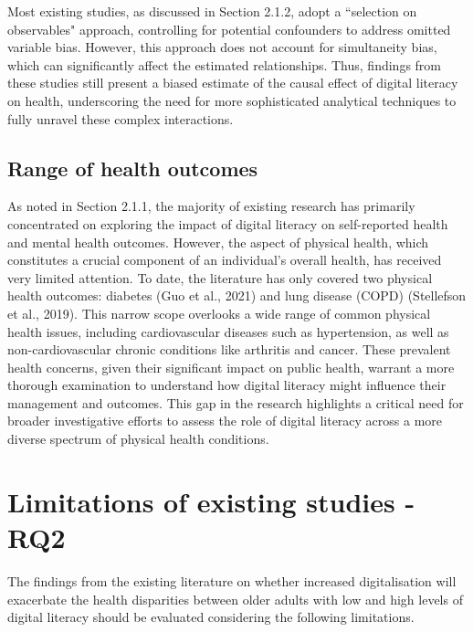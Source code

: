 Most existing studies, as discussed in Section 2.1.2, adopt a ``selection on observables" approach, controlling for potential confounders to address omitted variable bias. However, this approach does not account for simultaneity bias, which can significantly affect the estimated relationships. Thus, findings from these studies still present a biased estimate of the causal effect of digital literacy on health, underscoring the need for more sophisticated analytical techniques to fully unravel these complex interactions.

\subsection{Range of health outcomes}
As noted in Section 2.1.1, the majority of existing research has primarily concentrated on exploring the impact of digital literacy on self-reported health and mental health outcomes. However, the aspect of physical health, which constitutes a crucial component of an individual's overall health, has received very limited attention. To date, the literature has only covered two physical health outcomes: diabetes (Guo et al., 2021) and lung disease (COPD) (Stellefson et al., 2019). This narrow scope overlooks a wide range of common physical health issues, including cardiovascular diseases such as hypertension, as well as non-cardiovascular chronic conditions like arthritis and cancer. These prevalent health concerns, given their significant impact on public health, warrant a more thorough examination to understand how digital literacy might influence their management and outcomes. This gap in the research highlights a critical need for broader investigative efforts to assess the role of digital literacy across a more diverse spectrum of physical health conditions.

\section{Limitations of existing studies - RQ2}
The findings from the existing literature on whether increased digitalisation will exacerbate the health disparities between older adults with low and high levels of digital literacy should be evaluated considering the following limitations. 

